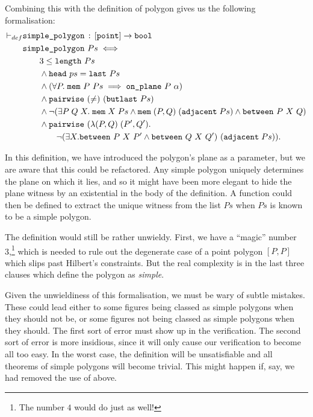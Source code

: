 Combining this with the definition of polygon gives us the following formalisation:
\begin{equation}\label{eq:SimplePolygonDef}
  \begin{split}
  \vdash_{def}&\texttt{simple\_polygon}\,:\,[\texttt{point}] \rightarrow \texttt{bool}\\
  &\texttt{simple\_polygon}\ Ps \iff \\
  &\qquad 3 \leq \texttt{length}\ Ps\\
  &\qquad\wedge \texttt{head}\ ps = \texttt{last}\ Ps\\
  &\qquad\wedge (\forall P.\;\texttt{mem}\ P\ Ps \implies \texttt{on\_plane}\ P\ \alpha)\\
  &\qquad\wedge \texttt{pairwise}\ (\neq)\ (\texttt{butlast}\ Ps)\\
  &\qquad\wedge \neg(\exists P\;Q\;X.\; \texttt{mem}\;X\;Ps\wedge\texttt{mem}\;(P,Q)\;(\texttt{adjacent}\;Ps)\wedge\texttt{between}\ P\ X\ Q)\\
  &\qquad\wedge \texttt{pairwise}\ (\lambda(P,Q)\;(P',Q').\\
  &\qquad\qquad\neg(\exists X. \texttt{between}\ P\ X\ P' \wedge \texttt{between}\ Q\ X\ Q')\ (\texttt{adjacent}\;Ps)).
  \end{split}
\end{equation}

In this definition, we have introduced the polygon's plane as a parameter, but we are aware that this could be refactored. Any simple polygon uniquely determines the plane on which it lies, and so it might have been more elegant to hide the plane witness by an existential in the body of the definition. A function could then be defined to extract the unique witness from the list $Ps$ when $Ps$ is known to be a simple polygon. 

The definition would still be rather unwieldy. First, we have a ``magic'' number 3,\footnote{The number $4$ would do just as well!} which is needed to rule out the degenerate case of a point polygon $[P,P]$ which slips past Hilbert's constraints. But the real complexity is in the last three clauses which define the polygon as \emph{simple}. 

Given the unwieldiness of this formalisation, we must be wary of subtle mistakes. These could lead either to some figures being classed as simple polygons when they should not be, or some figures not being classed as simple polygons when they should. The first sort of error must show up in the verification. The second sort of error is more insidious, since it will only cause our verification to become all too easy. In the worst case, the definition will be unsatisfiable and all theorems of simple polygons will become trivial. This might happen if, say, we had removed the use of  above.

